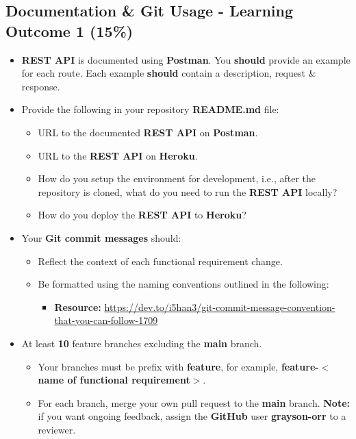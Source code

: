 \documentclass{article}
\begin{document}
\subsection*{Documentation \& Git Usage - Learning Outcome 1 (15\%)}
\begin{itemize}
	\item \textbf{REST API} is documented using \textbf{Postman}. You \textbf{should} provide an example for each route. Each example \textbf{should} contain a description, request \& response.
	\item Provide the following in your repository \textbf{README.md} file:
	      \begin{itemize}
		      \item URL to the documented \textbf{REST API} on \textbf{Postman}.
		      \item URL to the \textbf{REST API} on \textbf{Heroku}.
		      \item How do you setup the environment for development, i.e., after the repository is cloned, what do you need to run the \textbf{REST API} locally?
		      \item How do you deploy the \textbf{REST API} to \textbf{Heroku}?
	      \end{itemize}
	\item Your \textbf{Git commit messages} should:
	      \begin{itemize}
		      \item Reflect the context of each functional requirement change.
		      \item Be formatted using the naming conventions outlined in the following:
		            \begin{itemize}
			            \item \textbf{Resource:} \small\href{https://dev.to/i5han3/git-commit-message-convention-that-you-can-follow-1709}{https://dev.to/i5han3/git-commit-message-convention-that-you-can-follow-1709}
		            \end{itemize}
	      \end{itemize}
	\item At least \textbf{10} feature branches excluding the \textbf{main} branch.
	      \begin{itemize}
		      \item Your branches must be prefix with \textbf{feature}, for example, \textbf{feature-$<$name of functional requirement$>$}.
		      \item For each branch, merge your own pull request to the \textbf{main} branch. \textbf{Note:} if you want ongoing feedback, assign the \textbf{GitHub} user \textbf{grayson-orr} to a reviewer.
	      \end{itemize}
\end{itemize}
\end{document}
